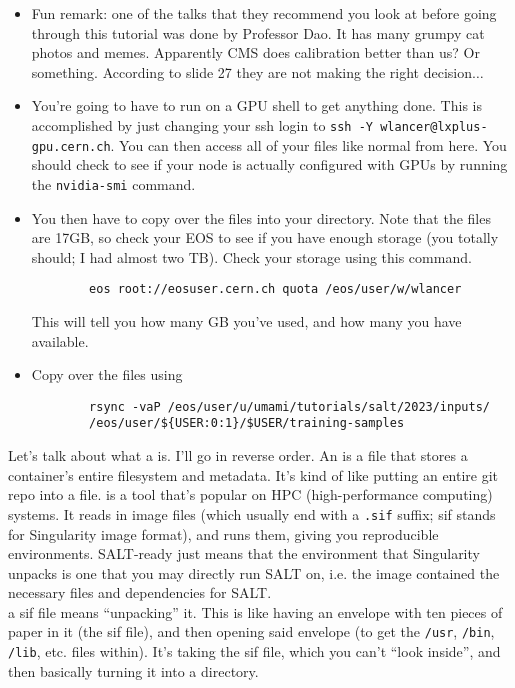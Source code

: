 \documentclass[11pt]{article}
\begin{document}
\begin{itemize}
    \item Fun remark: one of the talks that they recommend you look
    at before going through this tutorial was done by Professor Dao.
    It has many grumpy cat photos and memes. Apparently CMS does calibration
    better than us? Or something. According to slide 27 they are
    not making the right decision$\ldots$
    \item You're going to have to run on a GPU shell to get anything
    done. This is accomplished by just changing your ssh login
    to \verb|ssh -Y wlancer@lxplus-gpu.cern.ch|. You can then access
    all of your files like normal from here. You should check to
    see if your node is actually configured with GPUs by running
    the \verb|nvidia-smi| command.
    \item You then have to copy over the files into your directory.
    Note that the files are 17GB, so check your EOS to see if you
    have enough storage (you totally should; I had almost two TB). 
    Check your storage using this command.
    \begin{verbatim}
        eos root://eosuser.cern.ch quota /eos/user/w/wlancer
    \end{verbatim}
    This will tell you how many GB you've used, and how many you have
    available.
    \item Copy over the files using
    \begin{verbatim}
        rsync -vaP /eos/user/u/umami/tutorials/salt/2023/inputs/ 
        /eos/user/${USER:0:1}/$USER/training-samples
    \end{verbatim}
\end{itemize}

\begin{iidea}
    Let's talk about what a 
    is. I'll go in reverse order. An  is a file
    that stores a container's entire filesystem and metadata.
    It's kind of like putting an entire git repo into a file.
     is a tool that's popular on
    HPC (high-performance computing) systems. It reads in image
    files (which usually end with a \verb|.sif| suffix; sif
    stands for Singularity image format), and
    runs them, giving you reproducible environments. SALT-ready
    just means that the environment that Singularity unpacks is
    one that you may directly run SALT on, i.e. the image contained
    the necessary files and dependencies for SALT.\\

     a sif file means ``unpacking'' it. This
    is like having an envelope with ten pieces of paper in
    it (the sif file), and then opening said envelope (to get
    the \verb|/usr|, \verb|/bin|, \verb|/lib|, etc. files within).
    It's taking the sif file, which you can't ``look inside'', and then
    basically turning it into a directory.
\end{iidea}
\end{document}
